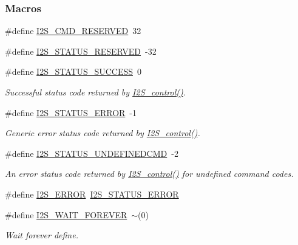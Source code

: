 \subsubsection*{Macros}
\begin{DoxyCompactItemize}
\item 
\#define \hyperlink{_i2_s_8h_af919ac4341fca59988c28e16058fa819}{I2\+S\+\_\+\+C\+M\+D\+\_\+\+R\+E\+S\+E\+R\+V\+E\+D}~32
\item 
\#define \hyperlink{_i2_s_8h_a3fad4fcf6773f3c5946c4881631f838d}{I2\+S\+\_\+\+S\+T\+A\+T\+U\+S\+\_\+\+R\+E\+S\+E\+R\+V\+E\+D}~-\/32
\item 
\#define \hyperlink{_i2_s_8h_a23118b46858671b6537d3a68721f0282}{I2\+S\+\_\+\+S\+T\+A\+T\+U\+S\+\_\+\+S\+U\+C\+C\+E\+S\+S}~0
\begin{DoxyCompactList}\small\item\em Successful status code returned by \hyperlink{_i2_s_8h_a1af19b22e9036bee696b4e4efe4916b0}{I2\+S\+\_\+control()}. \end{DoxyCompactList}\item 
\#define \hyperlink{_i2_s_8h_a775a6dc5aa644d4cca2179afbafb63ad}{I2\+S\+\_\+\+S\+T\+A\+T\+U\+S\+\_\+\+E\+R\+R\+O\+R}~-\/1
\begin{DoxyCompactList}\small\item\em Generic error status code returned by \hyperlink{_i2_s_8h_a1af19b22e9036bee696b4e4efe4916b0}{I2\+S\+\_\+control()}. \end{DoxyCompactList}\item 
\#define \hyperlink{_i2_s_8h_a649cf0c869381728fc9b56dfdbbd3e3d}{I2\+S\+\_\+\+S\+T\+A\+T\+U\+S\+\_\+\+U\+N\+D\+E\+F\+I\+N\+E\+D\+C\+M\+D}~-\/2
\begin{DoxyCompactList}\small\item\em An error status code returned by \hyperlink{_i2_s_8h_a1af19b22e9036bee696b4e4efe4916b0}{I2\+S\+\_\+control()} for undefined command codes. \end{DoxyCompactList}\item 
\#define \hyperlink{_i2_s_8h_a81d0dd9da59128b28cb23c59fe57c939}{I2\+S\+\_\+\+E\+R\+R\+O\+R}~\hyperlink{_i2_s_8h_a775a6dc5aa644d4cca2179afbafb63ad}{I2\+S\+\_\+\+S\+T\+A\+T\+U\+S\+\_\+\+E\+R\+R\+O\+R}
\item 
\#define \hyperlink{_i2_s_8h_a8fd310c110b6a9425cf61753f3e956ab}{I2\+S\+\_\+\+W\+A\+I\+T\+\_\+\+F\+O\+R\+E\+V\+E\+R}~$\sim$(0)
\begin{DoxyCompactList}\small\item\em Wait forever define. \end{DoxyCompactList}\end{DoxyCompactItemize}
